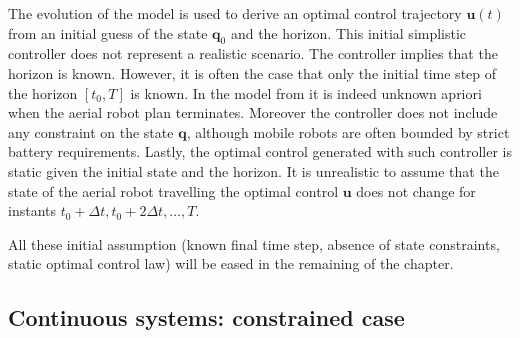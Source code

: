 The evolution of the model is used to derive an optimal control trajectory $\mathbf{u}(t)$ from an initial guess of the state $\mathbf{q}_0$ and the horizon. This initial simplistic controller does not represent a realistic scenario. The controller implies that the horizon is known. However, it is often the case that only the initial time step of the horizon $[t_0,T]$ is known. In the model from  it is indeed unknown apriori when the aerial robot plan terminates. Moreover the controller does not include any constraint on the state $\mathbf{q}$, although mobile robots are often bounded by strict battery requirements. Lastly, the optimal control generated with such controller is static given the initial state and the horizon. It is unrealistic to assume that the state of the aerial robot travelling the optimal control $\mathbf{u}$ does not change for instants $t_0+\Delta t,t_0+2\Delta t,\dots,T$.

All these initial assumption (known final time step, absence of state constraints, static optimal control law) will be eased in the remaining of the chapter.

\subsection{\color{red}Continuous systems: constrained case}
\label{sec:opt-constrained}

